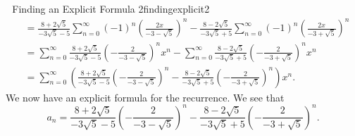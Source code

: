 \begin{exercise}{\Difficulty\,\Difficulty\,\Difficulty\,\,Finding an Explicit Formula 2}{findingexplicit2}
\begin{align*}
                &=\frac{8+2\sqrt{5}}{-3\sqrt{5}-5}\sum_{n=0}^\infty(-1)^n\left(\frac{2x}{-3-\sqrt{5}}\right)^n-\frac{8-2\sqrt{5}}{-3\sqrt{5}+5}\sum_{n=0}^\infty(-1)^n\left(\frac{2x}{-3+\sqrt{5}}\right)^n \\
                &=\sum_{n=0}^\infty\frac{8+2\sqrt{5}}{-3\sqrt{5}-5}\left(-\frac{2}{-3-\sqrt{5}}\right)^nx^n-\sum_{n=0}^\infty\frac{8-2\sqrt{5}}{-3\sqrt{5}+5}\left(-\frac{2}{-3+\sqrt{5}}\right)^nx^n \\
                &=\sum_{n=0}^\infty\left(\frac{8+2\sqrt{5}}{-3\sqrt{5}-5}\left(-\frac{2}{-3-\sqrt{5}}\right)^n-\frac{8-2\sqrt{5}}{-3\sqrt{5}+5}\left(-\frac{2}{-3+\sqrt{5}}\right)^n\right)x^n.
            \end{align*}
            We now have an explicit formula for the recurrence. We see that
            \begin{equation*}
                a_n=\frac{8+2\sqrt{5}}{-3\sqrt{5}-5}\left(-\frac{2}{-3-\sqrt{5}}\right)^n-\frac{8-2\sqrt{5}}{-3\sqrt{5}+5}\left(-\frac{2}{-3+\sqrt{5}}\right)^n.
            \end{equation*}
        
        \end{exercise}